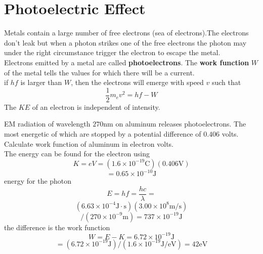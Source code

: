 \section{Photoelectric Effect}
Metals contain a large number of free electrons (sea of electrons).The electrons don't leak but when a photon strikes one of the free electrons the photon may under the right circumstance trigger the electron to escape the metal. \\
Electrons emitted by a metal are called \textbf{photoelectrons}. The \textbf{work function} $ W $ of the metal tells the values for which there will be a current. \\
if $ hf $ is larger than $ W $, then the electrons will emerge with speed $ v $ such that
\[ \dfrac{1}{2} m_e v^2 = hf -W \]
The $ KE $ of an electron is independent of intensity. 
\begin{example}
	EM radiation of wavelength $ 270 \mathrm{ nm } $ on aluminum releases photoelectrons. The most energetic of which are stopped by a potential difference of $ 0.406 $ volts. Calculate work function of aluminum in electron volts. \\
	The energy can be found for the electron using
	\[ K = e V = \left( 1.6 \times 10 ^ { - 19 } \mathrm { C } \right) ( 0.406 \mathrm { V } ) \] \[ = 0.65 \times 10 ^ { - 10 } \mathrm { J } \]
	energy for the photon
	\[ E = h f = \frac { h c } { \lambda } = \] \[ \left( 6.63 \times 10 ^ { - 4 } \mathrm { J } \cdot \mathrm { s } \right) \left( 3.00 \times 10 ^ { 8 } \mathrm { m } / \mathrm { s } \right)\] \[ / \left( 270 \times 10 ^ { - 9 } \mathrm { m } \right) = 737 \times 10 ^ { - 19 } \mathrm { J } \]
	the difference is the work function
	\[ W = E - K = 6.72 \times 10 ^ { - 19 } \mathrm { J }\] \[ = \left( 6.72 \times 10 ^ { - 19 } \mathrm { J } \right) / \left( 1.6 \times 10 ^ { - 19 } \mathrm { J } / \mathrm { eV } \right) = 42 \mathrm { eV } \]
\end{example}
